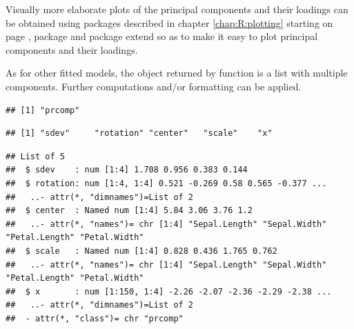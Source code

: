 \documentclass[krantz2]{krantz}\usepackage{knitr}%
\begin{document}
Visually more elaborate plots of the principal components and their loadings can be obtained using packages  described in chapter \ref{chap:R:plotting} starting on page \pageref{chap:R:plotting}, package  and package  extend  so as to make it easy to plot principal components and their loadings.

\begin{explainbox}
As for other fitted models, the object returned by function  is a list with multiple components. Further computations and/or formatting can be applied.

\begin{knitrout}\footnotesize
{}\color{fgcolor}\begin{kframe}
\begin{alltt}
\end{alltt}
\begin{verbatim}
## [1] "prcomp"
\end{verbatim}
\begin{alltt}
\end{alltt}
\begin{verbatim}
## [1] "sdev"     "rotation" "center"   "scale"    "x"
\end{verbatim}
\end{kframe}
\end{knitrout}

\begin{knitrout}\footnotesize
{}\color{fgcolor}\begin{kframe}
\begin{alltt}
  \hlstd{=} \hlstd{)}
\end{alltt}
\begin{verbatim}
## List of 5
##  $ sdev    : num [1:4] 1.708 0.956 0.383 0.144
##  $ rotation: num [1:4, 1:4] 0.521 -0.269 0.58 0.565 -0.377 ...
##   ..- attr(*, "dimnames")=List of 2
##  $ center  : Named num [1:4] 5.84 3.06 3.76 1.2
##   ..- attr(*, "names")= chr [1:4] "Sepal.Length" "Sepal.Width" "Petal.Length" "Petal.Width"
##  $ scale   : Named num [1:4] 0.828 0.436 1.765 0.762
##   ..- attr(*, "names")= chr [1:4] "Sepal.Length" "Sepal.Width" "Petal.Length" "Petal.Width"
##  $ x       : num [1:150, 1:4] -2.26 -2.07 -2.36 -2.29 -2.38 ...
##   ..- attr(*, "dimnames")=List of 2
##  - attr(*, "class")= chr "prcomp"
\end{verbatim}
\end{kframe}
\end{knitrout}
\end{explainbox}
\end{document}
